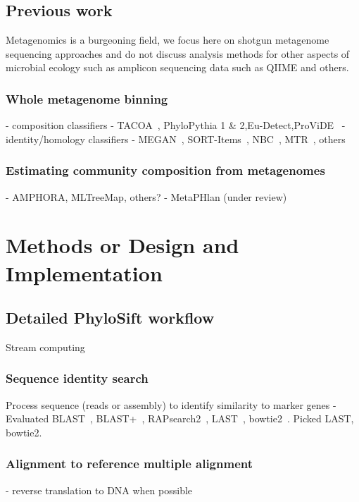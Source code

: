 \documentclass[10pt]{article}
\begin{document}
\subsection*{Previous work}
Metagenomics is a burgeoning field, we focus here on shotgun metagenome sequencing approaches and 
do not discuss analysis methods for other aspects of microbial ecology such as amplicon sequencing data such as QIIME and others. 
\subsubsection*{Whole metagenome binning}
- composition classifiers
  - TACOA~\cite{Diaz2009}, PhyloPythia 1 \& 2\cite{Patil2011},Eu-Detect\cite{Mohammed2011},ProViDE~\cite{Ghosh2011}
- identity/homology classifiers
  - MEGAN~\cite{Huson2007}, SORT-Items~\cite{Haque2009}, NBC~\cite{Rosen2011}, MTR~\cite{Gori2011}, others
\subsubsection*{Estimating community composition from metagenomes}
      - AMPHORA\cite{WuEisen2008}, MLTreeMap\cite{Stark2010}, others?
      - MetaPHlan (under review)

\section*{Methods or Design and Implementation}

\subsection*{Detailed PhyloSift workflow}
Stream computing
\subsubsection*{Sequence identity search}
Process sequence (reads or assembly) to identify similarity to marker genes
      - Evaluated BLAST~\cite{Altschul1997}, BLAST+~\cite{Camacho2009}, RAPsearch2~\cite{Zhao2011}, LAST~\cite{Kiełbasa2011}, bowtie2~\cite{Langmead2009}. Picked LAST, bowtie2.
\subsubsection*{Alignment to reference multiple alignment}
      - reverse translation to DNA when possible
\end{document}
